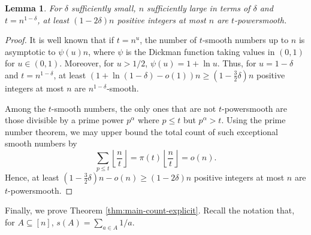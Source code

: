 \documentclass{daj}
\newtheorem{lemma}{Lemma}
\begin{document}
\begin{lemma}\label{lem:powersmooth}
    For $\delta$ sufficiently small, $n$ sufficiently large in terms of $\delta$ and $t = n^{1-\delta}$, at least $(1-2\delta)n$ positive integers at most $n$ are $t$-powersmooth. 
\end{lemma}
\begin{proof}
    It is well known that if $t = n^{u}$, the number of $t$-smooth numbers up to $n$ is asymptotic to $\psi(u)n$, where $\psi$ is the Dickman function taking values in $(0,1)$ for $u\in(0,1)$. Moreover, for $u>1/2$, $\psi(u) = 1+\ln u$. Thus, for $u=1-\delta$ and $t=n^{1-\delta}$, at least $(1+\ln(1-\delta)-o(1))n \ge (1-\frac 32 \delta)n$ positive integers at most $n$ are $n^{1-\delta}$-smooth.

    Among the $t$-smooth numbers, the only ones that are not $t$-powersmooth are those divisible by a prime power $p^{\alpha}$ where $p\le t$ but $p^\alpha > t$. Using the prime number theorem, we may upper bound the total count of such exceptional smooth numbers by
    \[
    \sum_{p \le t} \left\lfloor \frac{n}{t} \right\rfloor = \pi(t) \left\lfloor \frac{n}{t} \right\rfloor = o(n).
    \]
    Hence, at least $(1-\frac 32 \delta)n - o(n) \geq (1-2\delta)n$ positive integers at most $n$ are $t$-powersmooth.
\end{proof}

Finally, we prove Theorem \ref{thm:main-count-explicit}. Recall the notation that, for $A\subseteq [n]$, $s(A) = \sum_{a\in A}1/a$.
\end{document}
